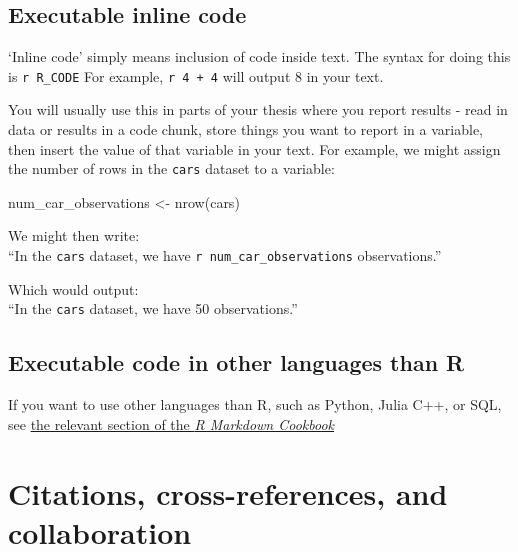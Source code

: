\documentclass[a4paper, twoside]{templates/ociamthesis}
\newenvironment{Shaded}{\begin{snugshade}}{\end{snugshade}}
\newcommand{\FunctionTok}[1]{\textcolor[rgb]{0.00,0.00,0.00}{#1}}
\newcommand{\NormalTok}[1]{#1}
\newcommand{\OtherTok}[1]{\textcolor[rgb]{0.56,0.35,0.01}{#1}}
\renewenvironment{Shaded}
{
  \vspace{10pt}%
  \begin{snugshade}%
}{%
  \end{snugshade}%
  \vspace{8pt}%
}
\begin{document}
\hypertarget{executable-inline-code}{%
\section{Executable inline code}\label{executable-inline-code}}

`Inline code' simply means inclusion of code inside text.
The syntax for doing this is \texttt{\textasciigrave{}r\ R\_CODE\textasciigrave{}}
For example, \texttt{\textasciigrave{}r\ 4\ +\ 4\textasciigrave{}} will output 8 in your text.

You will usually use this in parts of your thesis where you report results - read in data or results in a code chunk, store things you want to report in a variable, then insert the value of that variable in your text.
For example, we might assign the number of rows in the \texttt{cars} dataset to a variable:

\begin{Shaded}
\begin{Highlighting}[]
\NormalTok{num\_car\_observations }\OtherTok{\textless{}{-}} \FunctionTok{nrow}\NormalTok{(cars)}
\end{Highlighting}
\end{Shaded}

We might then write:\\
``In the \texttt{cars} dataset, we have \texttt{\textasciigrave{}r\ num\_car\_observations\textasciigrave{}} observations.''

Which would output:\\
``In the \texttt{cars} dataset, we have 50 observations.''

\hypertarget{executable-code-in-other-languages-than-r}{%
\section{Executable code in other languages than R}\label{executable-code-in-other-languages-than-r}}

If you want to use other languages than R, such as Python, Julia C++, or SQL, see \href{https://bookdown.org/yihui/rmarkdown-cookbook/other-languages.html}{the relevant section of the \emph{R Markdown Cookbook}}

\hypertarget{cites-and-refs}{%
\chapter{Citations, cross-references, and collaboration}\label{cites-and-refs}}
\end{document}
